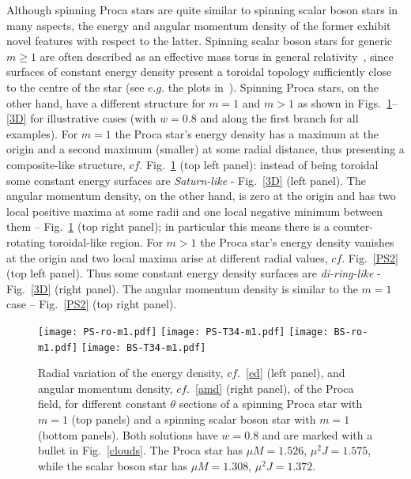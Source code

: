 Although spinning Proca stars are quite similar to spinning scalar boson stars in many aspects, the energy and angular momentum density of the former exhibit novel features with respect to the latter. Spinning scalar boson stars for generic $m\geqslant 1$ are often described as an effective mass torus in general relativity~\cite{Schunck:1996he}, since surfaces of constant energy density present a toroidal topology sufficiently close to the centre of the star (see $e.g.$ the plots in~\cite{Herdeiro:2014ima}).  Spinning Proca stars, on the other hand, have a different structure for $m=1$ and $m>1$ as shown in Figs.~\ref{PS1}--\ref{3D} for illustrative cases (with $w=0.8$ and along the first branch for all examples). For $m=1$ the Proca star's energy density has a maximum at the origin and a second maximum (smaller) at some radial distance, thus presenting a composite-like structure, $cf.$ Fig.~\ref{PS1} (top left panel): instead of being toroidal some constant energy surfaces are \textit{Saturn-like} - Fig.~\ref{3D} (left panel). The angular momentum density, on the other hand, is zero at the origin and has two local positive maxima at some radii and one local negative minimum between them -- Fig.~\ref{PS1} (top right panel); in particular this means there is a counter-rotating toroidal-like region. For $m>1$ the Proca star's energy density vanishes at the origin and two local maxima arise at different radial values, $cf.$ Fig.~\ref{PS2} (top left panel). Thus some constant energy density surfaces are \textit{di-ring-like} - Fig.~\ref{3D} (right panel). The angular momentum density is similar to the $m=1$ case -- Fig.~\ref{PS2} (top right panel).


\begin{figure}[h!]
  \begin{center}
    \texttt{[image: PS-ro-m1.pdf]}
       \texttt{[image: PS-T34-m1.pdf]}   
        \texttt{[image: BS-ro-m1.pdf]}
      \texttt{[image: BS-T34-m1.pdf]}
  \end{center}
 \caption{Radial variation of the energy density, $cf.$~\eqref{ed} (left panel), and angular momentum density, $cf.$~\eqref{amd}  (right panel),  of the Proca field, for different constant $\theta$ sections of a spinning Proca star with $m=1$ (top panels) and a spinning scalar boson star with $m=1$ (bottom panels). Both solutions have $w=0.8$ and are marked with a bullet in Fig.~\ref{clouds}. The Proca star has $\mu M= 1.526$,  $\mu^2J= 1.575$, while the scalar boson star has $\mu M=1.308$, $\mu^2J=1.372$.}
  \label{PS1}
\end{figure}



